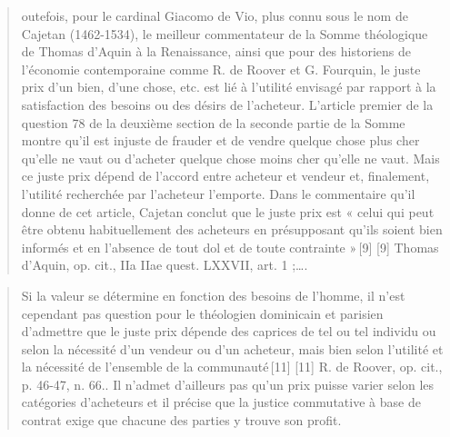  \begin{quote}
     outefois, pour le cardinal Giacomo de Vio, plus connu sous le nom de Cajetan (1462-1534), le meilleur commentateur de la Somme théologique de Thomas d’Aquin à la Renaissance, ainsi que pour des historiens de l’économie contemporaine comme R. de Roover et G. Fourquin, le juste prix d’un bien, d’une chose, etc. est lié à l’utilité envisagé par rapport à la satisfaction des besoins ou des désirs de l’acheteur. L’article premier de la question 78 de la deuxième section de la seconde partie de la Somme montre qu’il est injuste de frauder et de vendre quelque chose plus cher qu’elle ne vaut ou d’acheter quelque chose moins cher qu’elle ne vaut. Mais ce juste prix dépend de l’accord entre acheteur et vendeur et, finalement, l’utilité recherchée par l’acheteur l’emporte. Dans le commentaire qu’il donne de cet article, Cajetan conclut que le juste prix est « celui qui peut être obtenu habituellement des acheteurs en présupposant qu’ils soient bien informés et en l’absence de tout dol et de toute contrainte » [9]
[9]
Thomas d’Aquin, op. cit., IIa IIae quest. LXXVII, art. 1 ;….
 \end{quote}
 
 
 \begin{quote}
     Si la valeur se détermine en fonction des besoins de l’homme, il n’est cependant pas question pour le théologien dominicain et parisien d’admettre que le juste prix dépende des caprices de tel ou tel individu ou selon la nécessité d’un vendeur ou d’un acheteur, mais bien selon l’utilité et la nécessité de l’ensemble de la communauté [11]
[11]
R. de Roover, op. cit., p. 46-47, n. 66.. Il n’admet d’ailleurs pas qu’un prix puisse varier selon les catégories d’acheteurs et il précise que la justice commutative à base de contrat exige que chacune des parties y trouve son profit. 
 \end{quote}
 
 
